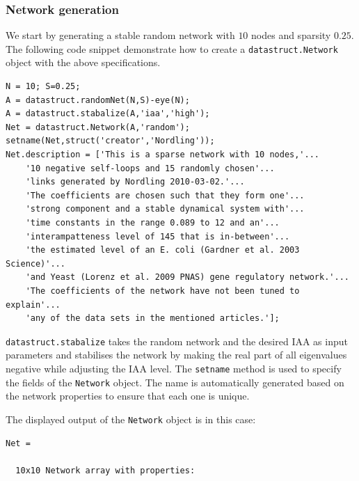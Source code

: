 \begin{bibunit}
\subsubsection{Network generation}
\label{sec:Network_generation_example}
We start by generating a stable random network with \(10\) nodes and sparsity \(0.25\).
The following code snippet demonstrate how to create a
\texttt{datastruct.Network} object with the above specifications.
\begin{verbatim}
N = 10; S=0.25;
A = datastruct.randomNet(N,S)-eye(N);
A = datastruct.stabalize(A,'iaa','high');
Net = datastruct.Network(A,'random');
setname(Net,struct('creator','Nordling'));
Net.description = ['This is a sparse network with 10 nodes,'...
    '10 negative self-loops and 15 randomly chosen'...
    'links generated by Nordling 2010-03-02.'...
    'The coefficients are chosen such that they form one'...
    'strong component and a stable dynamical system with'...
    'time constants in the range 0.089 to 12 and an'...
    'interampatteness level of 145 that is in-between'...
    'the estimated level of an E. coli (Gardner et al. 2003 Science)'...
    'and Yeast (Lorenz et al. 2009 PNAS) gene regulatory network.'...
    'The coefficients of the network have not been tuned to explain'...
    'any of the data sets in the mentioned articles.'];
\end{verbatim}
\texttt{datastruct.stabalize} takes the random network and the desired IAA as input parameters and stabilises the network by making the real part of all eigenvalues negative while adjusting the IAA level.
The \texttt{setname} method is used to specify the fields of the \texttt{Network} object.
The name is automatically generated based on the network properties to ensure that each one is unique.

The displayed output of the \texttt{Network} object is in this case:
\begin{verbatim}
Net =

  10x10 Network array with properties:


\end{verbatim}
\end{bibunit}
